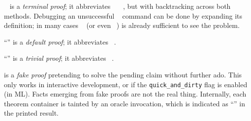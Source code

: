 \begin{isabellebody}
\begin{isamarkuptext}
\begin{description}
  \item \hyperlink{command.by}{\mbox{}}~ is a \emph{terminal
  proof}; it abbreviates \hyperlink{command.proof}{\mbox{}}~~~, but with
  backtracking across both methods.  Debugging an unsuccessful
  \hyperlink{command.by}{\mbox{}}~ command can be done by expanding its
  definition; in many cases \hyperlink{command.proof}{\mbox{}}~ (or even
  ~) is already sufficient to see the
  problem.

  \item ``\hyperlink{command.ddot}{\mbox{}}'' is a \emph{default
  proof}; it abbreviates \hyperlink{command.by}{\mbox{}}~.

  \item ``\hyperlink{command.dot}{\mbox{}}'' is a \emph{trivial
  proof}; it abbreviates \hyperlink{command.by}{\mbox{}}~.
  
  \item \hyperlink{command.sorry}{\mbox{}} is a \emph{fake proof}
  pretending to solve the pending claim without further ado.  This
  only works in interactive development, or if the \verb|quick_and_dirty| flag is enabled (in ML).  Facts emerging from fake
  proofs are not the real thing.  Internally, each theorem container
  is tainted by an oracle invocation, which is indicated as ``'' in the printed result.
  

\end{description}
\end{isamarkuptext}
\end{isabellebody}
